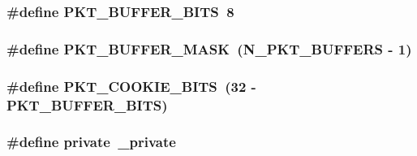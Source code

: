 \subsubsection[{\texorpdfstring{P\+K\+T\+\_\+\+B\+U\+F\+F\+E\+R\+\_\+\+B\+I\+TS}{PKT_BUFFER_BITS}}]{\setlength{\rightskip}{0pt plus 5cm}\#define P\+K\+T\+\_\+\+B\+U\+F\+F\+E\+R\+\_\+\+B\+I\+TS~8}\hypertarget{openflow-interface_8h_aed8531856517a618c41da6948e8b9176}{}\label{openflow-interface_8h_aed8531856517a618c41da6948e8b9176}
\subsubsection[{\texorpdfstring{P\+K\+T\+\_\+\+B\+U\+F\+F\+E\+R\+\_\+\+M\+A\+SK}{PKT_BUFFER_MASK}}]{\setlength{\rightskip}{0pt plus 5cm}\#define P\+K\+T\+\_\+\+B\+U\+F\+F\+E\+R\+\_\+\+M\+A\+SK~({\bf N\+\_\+\+P\+K\+T\+\_\+\+B\+U\+F\+F\+E\+RS} -\/ 1)}\hypertarget{openflow-interface_8h_aa111ed922246d6e0a5d4de53d021a6a7}{}\label{openflow-interface_8h_aa111ed922246d6e0a5d4de53d021a6a7}
\subsubsection[{\texorpdfstring{P\+K\+T\+\_\+\+C\+O\+O\+K\+I\+E\+\_\+\+B\+I\+TS}{PKT_COOKIE_BITS}}]{\setlength{\rightskip}{0pt plus 5cm}\#define P\+K\+T\+\_\+\+C\+O\+O\+K\+I\+E\+\_\+\+B\+I\+TS~(32 -\/ {\bf P\+K\+T\+\_\+\+B\+U\+F\+F\+E\+R\+\_\+\+B\+I\+TS})}\hypertarget{openflow-interface_8h_a99a380d45f0b6885385e341b368f58db}{}\label{openflow-interface_8h_a99a380d45f0b6885385e341b368f58db}
\subsubsection[{\texorpdfstring{private}{private}}]{\setlength{\rightskip}{0pt plus 5cm}\#define private~\+\_\+private}\hypertarget{openflow-interface_8h_a6a1d6e1a12975a4e9a0b5b952e79eaad}{}\label{openflow-interface_8h_a6a1d6e1a12975a4e9a0b5b952e79eaad}


